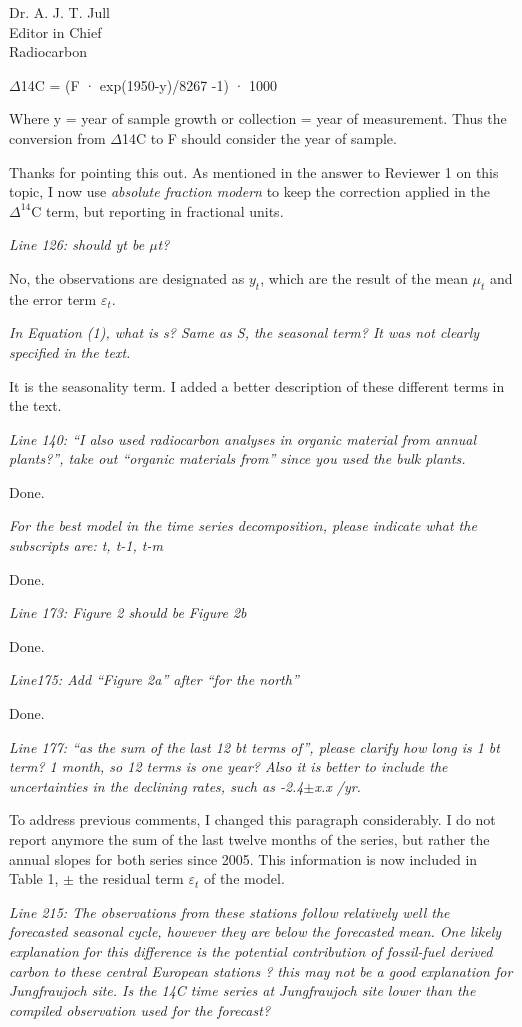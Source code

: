 \documentclass[11pt]{bgcletter}
\begin{document}
\begin{letter}{Dr. A. J. T. Jull \\
 Editor in Chief \\ Radiocarbon}
{$\Delta$14C = (F · exp(1950-y)/8267 -1) · 1000

Where y = year of sample growth or collection = year of measurement.
Thus the conversion from $\Delta$14C to F should consider the year of sample.}

{\color{blue} Thanks for pointing this out. As mentioned in the answer to Reviewer 1 on this topic, I now use \emph{absolute fraction modern} to keep the correction applied in the $\Delta^{14}$C term, but reporting in fractional units. }

{\it Line 126: should yt be $\mu$t?}

{\color{blue} No, the observations are designated as $y_t$, which are the result of the mean $\mu_t$ and the error term $\varepsilon_t$.}

{\it In Equation (1), what is s? Same as S, the seasonal term? It was not clearly specified in the text.}

{\color{blue} It is the seasonality term. I added a better description of these different terms in the text.}

{\it Line 140: ``I also used radiocarbon analyses in organic material from annual plants?'', take out ``organic materials from'' since you used the bulk plants. }

{\color{blue} Done.}

{\it For the best model in the time series decomposition, please indicate what the subscripts are: t, t-1, t-m}

{\color{blue} Done.}

{\it Line 173: Figure 2 should be Figure 2b}

{\color{blue} Done.}

{\it Line175: Add ``Figure 2a'' after ``for the north''}

{\color{blue} Done.}

{\it Line 177: ``as the sum of the last 12 bt terms of'', please clarify how long is 1 bt term? 1 month, so 12 terms is one year? Also it is better to include the uncertainties in the declining rates, such as -2.4$\pm$x.x \textperthousand /yr.}

{\color{blue} To address previous comments, I changed this paragraph considerably. I do not report anymore the sum of the last twelve months of the series, but rather the annual slopes for both series since 2005. This information is now included in Table 1, $\pm$ the residual term $\varepsilon_t$ of the model.}

{\it Line 215: The observations from these stations follow relatively well the forecasted seasonal cycle, however they are below the forecasted mean. One likely explanation for this difference is the potential contribution of fossil-fuel derived carbon to these central European stations ? this may not be a good explanation for Jungfraujoch site. Is the 14C time series at Jungfraujoch site lower than the compiled observation used for the forecast?}


\end{letter}
\end{document}
